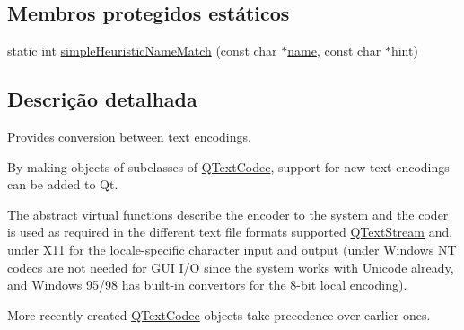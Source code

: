 \subsection*{Membros protegidos estáticos}
\begin{DoxyCompactItemize}
\item 
static int \hyperlink{class_q_text_codec_ab977446514dde5b6663124372812eba5}{simple\-Heuristic\-Name\-Match} (const char $\ast$\hyperlink{class_q_text_codec_a5bf2c67878639a29dfd3d648b93f17a2}{name}, const char $\ast$hint)
\end{DoxyCompactItemize}


\subsection{Descrição detalhada}
Provides conversion between text encodings. 

By making objects of subclasses of \hyperlink{class_q_text_codec}{Q\-Text\-Codec}, support for new text encodings can be added to Qt.

The abstract virtual functions describe the encoder to the system and the coder is used as required in the different text file formats supported \hyperlink{class_q_text_stream}{Q\-Text\-Stream} and, under X11 for the locale-\/specific character input and output (under Windows N\-T codecs are not needed for G\-U\-I I/\-O since the system works with Unicode already, and Windows 95/98 has built-\/in convertors for the 8-\/bit local encoding).

More recently created \hyperlink{class_q_text_codec}{Q\-Text\-Codec} objects take precedence over earlier ones.


